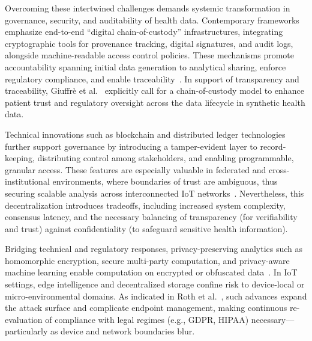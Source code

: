 \documentclass[sigconf]{acmart}
\begin{document}
Overcoming these intertwined challenges demands systemic transformation in governance, security, and auditability of health data. Contemporary frameworks emphasize end-to-end “digital chain-of-custody” infrastructures, integrating cryptographic tools for provenance tracking, digital signatures, and audit logs, alongside machine-readable access control policies. These mechanisms promote accountability spanning initial data generation to analytical sharing, enforce regulatory compliance, and enable traceability~\cite{ref4, ref5, ref10, ref13, ref14, ref16, ref17, ref18, ref19, ref20, ref21, ref22, ref23, ref24, ref25, ref30, ref31, ref33, ref34, ref35, ref44, ref45, ref46, ref50, ref51, ref61, ref62, ref64, ref65, ref76, ref77, ref91, ref106}. In support of transparency and traceability, Giuffrè et al.~\cite{ref91} explicitly call for a chain-of-custody model to enhance patient trust and regulatory oversight across the data lifecycle in synthetic health data.

Technical innovations such as blockchain and distributed ledger technologies further support governance by introducing a tamper-evident layer to record-keeping, distributing control among stakeholders, and enabling programmable, granular access. These features are especially valuable in federated and cross-institutional environments, where boundaries of trust are ambiguous, thus securing scalable analysis across interconnected IoT networks~\cite{ref4, ref5, ref10, ref13, ref14, ref16, ref17, ref18, ref19, ref20, ref21, ref22, ref23, ref24, ref25, ref30, ref31, ref33, ref34, ref35, ref44, ref45, ref46, ref50, ref51, ref61, ref62, ref64, ref65, ref76, ref77, ref91, ref106}. Nevertheless, this decentralization introduces tradeoffs, including increased system complexity, consensus latency, and the necessary balancing of transparency (for verifiability and trust) against confidentiality (to safeguard sensitive health information).

Bridging technical and regulatory responses, privacy-preserving analytics such as homomorphic encryption, secure multi-party computation, and privacy-aware machine learning enable computation on encrypted or obfuscated data~\cite{ref4, ref5, ref10, ref16, ref17, ref18, ref19, ref20, ref21, ref22, ref23, ref24, ref25, ref44, ref45, ref61, ref62, ref64, ref65, ref76, ref77, ref91, ref106}. In IoT settings, edge intelligence and decentralized storage confine risk to device-local or micro-environmental domains. As indicated in Roth et al.~\cite{ref51}, such advances expand the attack surface and complicate endpoint management, making continuous re-evaluation of compliance with legal regimes (e.g., GDPR, HIPAA) necessary---particularly as device and network boundaries blur.
\end{document}
